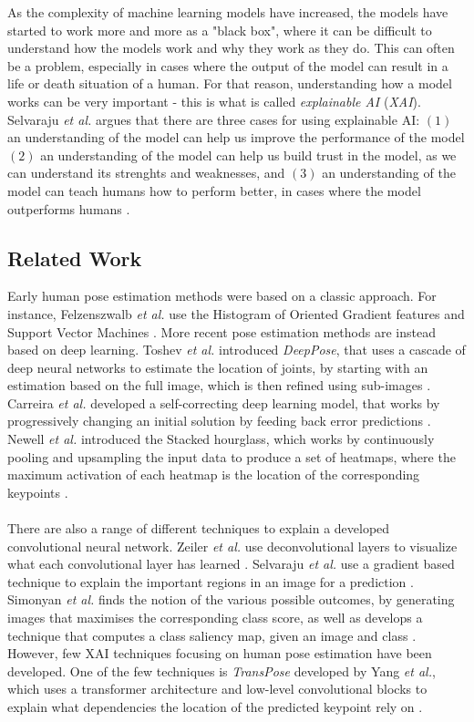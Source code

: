 \documentclass[./main.tex]{subfiles}
\begin{document}
As the complexity of machine learning models have increased, the models have started to work more and more as a "black box", where it can be difficult to understand how the models work and why they work as they do. This can often be a problem, especially in cases where the output of the model can result in a life or death situation of a human. For that reason, understanding how a model works can be very important - this is what is called \textit{explainable AI} (\textit{XAI}). Selvaraju \textit{et al.} \cite{Selvaraju} argues that there are three cases for using explainable AI: $(1)$ an understanding of the model can help us improve the performance of the model $(2)$ an understanding of the model can help us build trust in the model, as we can understand its strenghts and weaknesses, and $(3)$ an understanding of the model can teach humans how to perform better, in cases where the model outperforms humans \cite{Selvaraju}.

\subsection{Related Work}
Early human pose estimation methods were based on a classic approach. For instance, Felzenszwalb \textit{et al.} use the Histogram of Oriented Gradient features and Support Vector Machines \cite{Felzenszwalb}. More recent pose estimation methods are instead based on deep learning. Toshev \textit{et al.} introduced \textit{DeepPose}, that uses a cascade of deep neural networks to estimate the location of joints, by starting with an estimation based on the full image, which is then refined using sub-images \cite{DeepPose}. Carreira \textit{et al.} developed a self-correcting deep learning model, that works by progressively changing an initial solution by feeding back error predictions \cite{Carreira}. Newell \textit{et al.} introduced the Stacked hourglass, which works by continuously pooling and upsampling the input data to produce a set of heatmaps, where the maximum activation of each heatmap is the location of the corresponding keypoints \cite{Newell}.
\\
\\
There are also a range of different techniques to explain a developed convolutional neural network. Zeiler \textit{et al.} use deconvolutional layers to visualize what each convolutional layer has learned \cite{Zeiler}. Selvaraju \textit{et al.} use a gradient based technique to explain the important regions in an image for a prediction \cite{Selvaraju}. Simonyan \textit{et al.} finds the notion of the various possible outcomes, by generating images that maximises the corresponding class score, as well as develops a technique that computes a class saliency map, given an image and class \cite{Simonyan}. However, few XAI techniques focusing on human pose estimation have been developed. One of the few techniques is \textit{TransPose} developed by Yang \textit{et al.}, which uses a transformer architecture and low-level convolutional blocks to explain what dependencies the location of the predicted keypoint rely on \cite{TransPose}.
\end{document}

